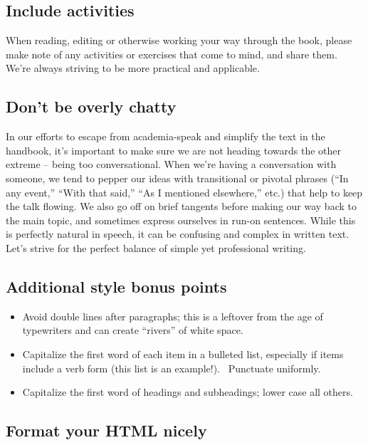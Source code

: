 \subsection{Include activities}\label{include-activities}

When reading, editing or otherwise working your way through the book,
please make note of any activities or exercises that come to mind, and
share them.~ We're always striving to be more practical and applicable.

\subsection{Don't be overly chatty}\label{dont-be-overly-chatty}

In our efforts to escape from academia-speak and simplify the text in
the handbook, it's important to make sure we are not heading towards the
other extreme -- being too conversational. When we're having a
conversation with someone, we tend to pepper our ideas with transitional
or pivotal phrases (``In any event,'' ``With that said,'' ``As I
mentioned elsewhere,'' etc.) that help to keep the talk flowing. We also
go off on brief tangents before making our way back to the main topic,
and sometimes express ourselves in run-on sentences. While this is
perfectly natural in speech, it can be confusing and complex in written
text. Let's strive for the perfect balance of simple yet professional
writing.

\subsection{Additional style bonus
points}\label{additional-style-bonus-points}

\begin{itemize}
\itemsep1pt\parskip0pt
\item
  Avoid double lines after paragraphs; this is a leftover from the age
  of typewriters and can create ``rivers'' of white space.
\item
  Capitalize the first word of each item in a bulleted list, especially
  if items include a verb form (this list is an example!).~ Punctuate
  uniformly.
\item
  Capitalize the first word of headings and subheadings; lower case all
  others.
\end{itemize}

\subsection{Format your HTML nicely}\label{format-your-html-nicely}

